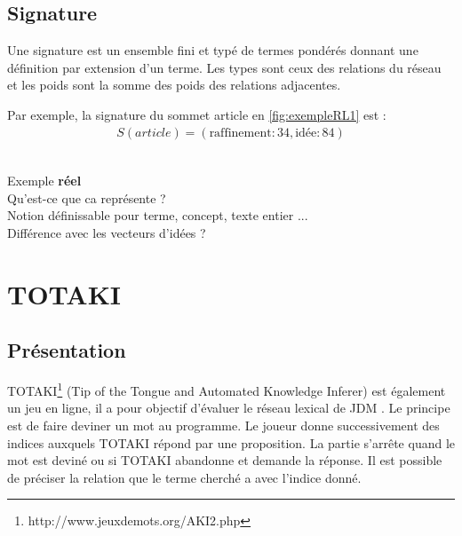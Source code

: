 \subsection{Signature}

Une signature est un ensemble fini et typé de termes pondérés donnant une
définition par extension d'un terme.
Les types sont ceux des relations du réseau et les poids sont la somme 
des poids des relations adjacentes.

Par exemple, la signature du sommet \og article \fg en \ref{fig:exempleRL1}
est :
\begin{align*}
	S(article) = (\text{raffinement} : 34, \text{idée} : 84)
\end{align*}

\begin{todo} ~\\
	Exemple \textbf{réel} \\
	Qu'est-ce que ca représente ? \\
	Notion définissable pour terme, concept, texte entier ... \\
	Différence avec les vecteurs d'idées ? \\
\end{todo}

\section{TOTAKI}

\subsection{Présentation}

TOTAKI\footnote{http://www.jeuxdemots.org/AKI2.php} (Tip of the Tongue and
Automated Knowledge Inferer) est également un jeu en ligne, il a pour objectif
d'évaluer le réseau lexical de JDM \citep{joubert_lirmm-00832991}.
Le principe est de faire deviner un mot au programme.
Le joueur donne successivement des indices auxquels TOTAKI répond par une
proposition.
La partie s'arrête quand le mot est deviné ou si TOTAKI abandonne et demande
la réponse.
Il est possible de préciser la relation que le terme cherché a avec l'indice
donné.

\medskip

